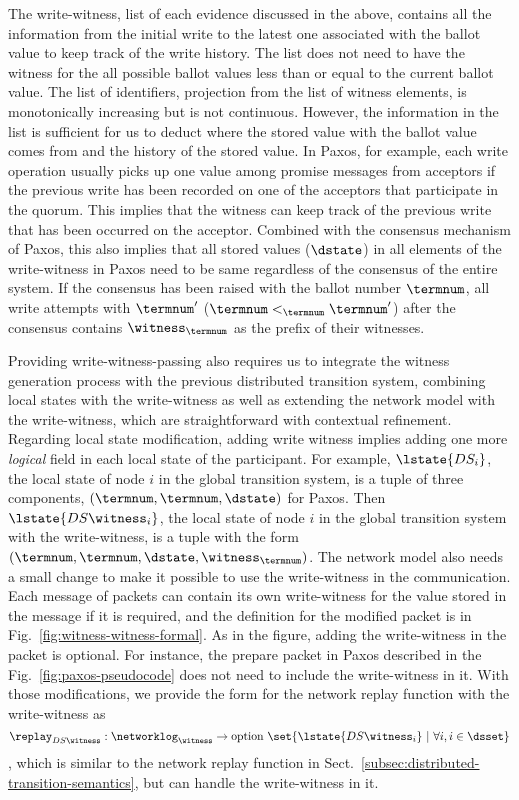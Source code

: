 The write-witness, list of each evidence discussed in the above, contains all the information from the initial write to the latest one associated with
the ballot value to keep track of the write history.
The list does not need to have the witness for the all possible ballot values less than or equal to the current ballot value. 
The list of identifiers, projection from the list of witness elements, is monotonically increasing but is not continuous.
However, the information in the list is sufficient for us to deduct where the stored value with the ballot value comes from and the history of the stored value. 
In Paxos, for example, 
each write operation usually picks up one value among promise messages from acceptors 
if the previous write has been recorded on one of the acceptors that participate in the quorum. 
This implies that the witness can keep track of the previous write that has been occurred on the acceptor. 
Combined with the consensus mechanism of Paxos,
this also implies that all stored values ($\dstate$) in all elements of the write-witness in Paxos
need to be same regardless of the consensus of the entire system. 
If the consensus has been raised with the ballot number $\termnum$, 
all write attempts with $\termnum'$ ($\termnum <_{\termnum} \termnum'$) after the consensus contains 
$\witness_{\termnum}$ as  the prefix of their witnesses.


Providing write-witness-passing also requires us to integrate the witness generation process with the previous distributed transition system, combining local states with the write-witness as well as extending the network model with the write-witness, which are straightforward with contextual refinement.
Regarding local state modification, adding write witness implies adding one more \textit{logical} field in each local state of the participant. 
For example, $\lstate{DS_i}$, the local state of node $i$ in the global transition system, is a tuple of three components, 
$(\termnum, \termnum, \dstate)$ for Paxos.
Then $\lstate{DS\witness_i}$, the local state of node $i$ in the global transition system with the write-witness, 
is a tuple with the form $(\termnum, \termnum, \dstate, \witness_{\termnum})$.
The network model also needs a small change to make it possible to use the write-witness in the communication. 
Each message of packets can contain its own write-witness for the value stored in the message
if it is required, and the definition for the modified packet is in Fig.~\ref{fig:witness-witness-formal}.
As in the figure, adding the write-witness in the packet is optional.
For instance, the prepare packet in Paxos described in the Fig.~\ref{fig:paxos-pseudocode} does not need to include the write-witness in it.
With those modifications, we provide the form for the network replay function with the write-witness as
$$\replay_{DS\witness}: {\networklog}_{\witness} \rightarrow \mbox{option}\ \set{\lstate{DS\witness_i}~\vert~\forall i, i \in \dsset} $$
, which is similar to the network replay function in Sect.~\ref{subsec:distributed-transition-semantics}, but can handle the write-witness in it. 

